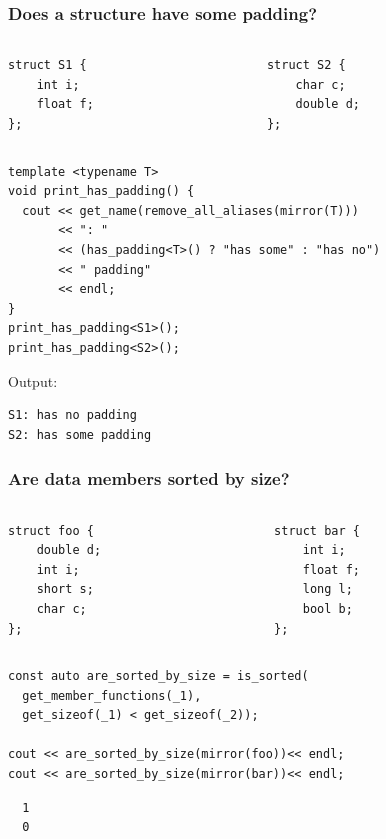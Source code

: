 \documentclass[compress,table,xcolor=table]{beamer}
\begin{document}
\begin{frame}[fragile]
  \frametitle{Does a structure have some padding?}
  \begin{columns}
    \begin{column}{.50\textwidth}
      \begin{lstlisting}[language=c++2x,basicstyle=\footnotesize\ttfamily]
struct S1 {
    int i;
    float f;
};
      \end{lstlisting}
    \end{column}
    \begin{column}{.40\textwidth}
      \begin{lstlisting}[language=c++2x,basicstyle=\footnotesize\ttfamily]
struct S2 {
    char c;
    double d;
};
      \end{lstlisting}
    \end{column}
  \end{columns}
  \begin{lstlisting}[language=c++2x,basicstyle=\scriptsize\ttfamily]
template <typename T>
void print_has_padding() {
  cout << get_name(remove_all_aliases(mirror(T)))
       << ": "
       << (has_padding<T>() ? "has some" : "has no")
       << " padding"
       << endl;
}
print_has_padding<S1>();
print_has_padding<S2>();
  \end{lstlisting}
  Output:
  \begin{verbatim}
S1: has no padding
S2: has some padding
  \end{verbatim}
\end{frame}
\begin{frame}[fragile]
  \frametitle{Are data members sorted by size?}
  \begin{columns}
    \begin{column}{.45\textwidth}
      \begin{lstlisting}[language=c++2x,basicstyle=\small\ttfamily]
struct foo {
    double d;
    int i;
    short s;
    char c;
};
      \end{lstlisting}
    \end{column}
    \begin{column}{.45\textwidth}
      \begin{lstlisting}[language=c++2x,basicstyle=\small\ttfamily]
struct bar {
    int i;
    float f;
    long l;
    bool b;
};
      \end{lstlisting}
    \end{column}
  \end{columns}
  \begin{lstlisting}[language=c++2x,basicstyle=\small\ttfamily]
const auto are_sorted_by_size = is_sorted(
  get_member_functions(_1),
  get_sizeof(_1) < get_sizeof(_2));

cout << are_sorted_by_size(mirror(foo))<< endl;
cout << are_sorted_by_size(mirror(bar))<< endl;
  \end{lstlisting}
  \begin{verbatim}
  1
  0
  \end{verbatim}
\end{frame}
\end{document}
